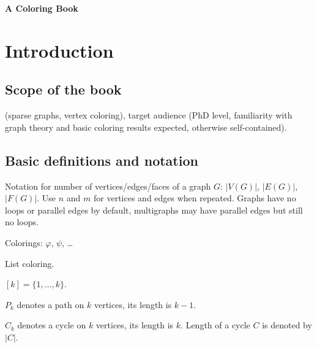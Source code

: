\documentclass[12pt,twoside,openright,a4paper]{book}
\begin{document}
\pagestyle{empty}
\begin{titlepage}

\begin{center}

\vspace{10cm}

{\large\bf A Coloring Book}

\end{center}
\end{titlepage}

\newpage

\pagestyle{plain}
\tableofcontents

\newpage

\pagestyle{headings}
\setcounter{page}{1}

\chapter*{Introduction}

\section{Scope of the book}

(sparse graphs, vertex coloring), target audience (PhD level,
familiarity with graph theory and basic coloring results expected, otherwise self-contained).

\section{Basic definitions and notation}


Notation for number of vertices/edges/faces of a graph $G$:
$|V(G)|$, $|E(G)|$, $|F(G)|$.  Use $n$ and $m$ for vertices and edges when repeated.
Graphs have no loops or parallel edges by default, multigraphs may have parallel edges but still no loops.

Colorings: $\varphi$, $\psi$, \ldots

List coloring.

$[k]=\{1,\ldots,k\}$.

$P_k$ denotes a path on $k$ vertices, its length is $k-1$.

$C_k$ denotes a cycle on $k$ vertices, its length is $k$.  Length of a cycle $C$ is denoted by $|C|$.
\end{document}
